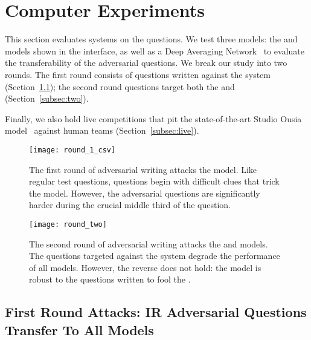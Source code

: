\section{Computer Experiments}
\label{sec:experiments}

This section evaluates  systems on the \challenge{} questions. We
test three models: the  and  models shown in the interface, as well as a Deep Averaging Network~\cite[]{iyyer2015deep} to evaluate the transferability of the adversarial questions. We break our study into two rounds. The first round consists of \challenge{} questions written against
the  system (Section~\ref{subsec:one}); the second round questions target
both the  and  (Section~\ref{subsec:two}).

Finally, we also hold live competitions that pit the state-of-the-art Studio Ousia model~\cite{yamada2018studio} against human teams (Section~\ref{subsec:live}).

\begin{figure*}[t!]
\centering  
\texttt{[image: round\_1\_csv]}
\caption{The first round of adversarial writing attacks the  model. Like regular test
questions, \challenge{} questions begin with difficult clues that trick the model. However,
the adversarial questions are significantly harder during the crucial middle
third of the question.}
\label{fig:round_one}

\centering
\texttt{[image: round\_two]}
\caption{The second round of adversarial writing attacks the  and  models. The questions targeted against the  system degrade the performance of all models. However, the reverse does not hold: the  model is robust to the questions written to fool the .}
\label{fig:round_two}
\end{figure*}

\subsection{First Round Attacks: IR Adversarial
Questions Transfer To All Models}\label{subsec:one}

